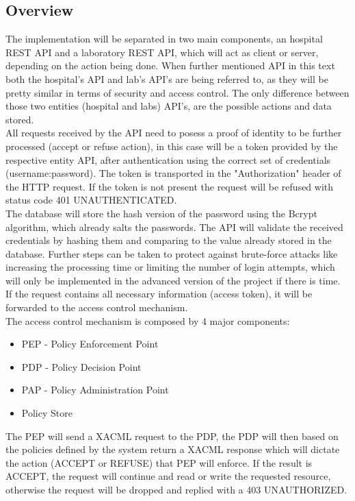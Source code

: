 \subsection{Overview}

The implementation will be separated in two main components, an hospital REST API and a laboratory REST API, which will act as client or server, depending on the action being done. When further mentioned API in this text both the hospital's API and lab's API's are being referred to, as they will be pretty similar in terms of security and access control. The only difference between those two entities (hospital and labs) API's, are the possible actions and data stored. \\

All requests received by the API need to posess a proof of identity to be further processed (accept or refuse action), in this case will be a token provided by the respective entity API, after authentication using the correct set of credentials (username:password). The token is transported in the "Authorization" header of the HTTP request. If the token is not present the request will be refused with status code 401 UNAUTHENTICATED. \\

The database will store the hash version of the password using the Bcrypt algorithm, which already salts the passwords. The API will validate the received credentials by hashing them and comparing to the value already stored in the database. Further steps can be taken to protect against brute-force attacks like increasing the processing time or limiting the number of login attempts, which will only be implemented in the advanced version of the project if there is time. \\


If the request contains all necessary information (access token), it will be forwarded to the access control mechanism. \\

The access control mechanism is composed by 4 major components:
\begin{itemize}
	\item PEP - Policy Enforcement Point
	\item PDP - Policy Decision Point
	\item PAP - Policy Administration Point
	\item Policy Store
\end{itemize}

The PEP will send a XACML request to the PDP, the PDP will then based on the policies defined by the system return a XACML response which will dictate the action (ACCEPT or REFUSE) that PEP will enforce. If the result is ACCEPT, the request will continue and read or write the requested resource, otherwise the request will be dropped and replied with a 403 UNAUTHORIZED.


